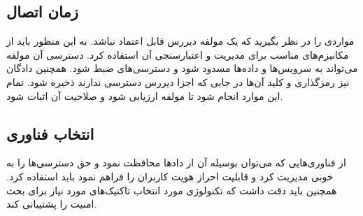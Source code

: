 \subsection{زمان اتصال}
مواردی را در نظر بگیرید که یک مولفه دیررس قابل اعتماد نباشد. 
به این منظور باید از مکانیزم‌های مناسب برای مدیریت و اعتبارسنجی آن‌ استفاده کرد. دسترسی آن مولفه می‌تواند به سرویس‌ها و داده‌ها مسدود شود و دسترسی‌های ضبط شود. همچنین دادگان نیز رمزگذاری و کلید آن‌ها در جایی که اجزا دیررس دسترسی ندارند ذخیره شود. تمام این موارد انجام شود تا مولفه ارزیابی شود و صلاحیت آن اثبات شود.

\subsection{انتخاب فناوری}
از فناوری‌هایی که می‌توان بوسیله آن از داد‌ها محافظت نمود و حق دسترسی‌ها را به خوبی مدیریت کرد و قابلیت احراز هویت کاربران را فراهم نمود باید استفاده کرد.
همچنین باید دقت داشت که تکنولوژی مورد انتخاب تاکتیک‌های مورد نیاز برای بحث امنیت را پشتیبانی کند.